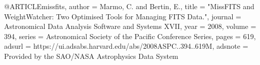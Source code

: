 
@ARTICLE{missfits,
       author = {{Marmo}, C. and {Bertin}, E.},
        title = "{MissFITS and WeightWatcher: Two Optimised Tools for Managing FITS Data.}",
      journal = {Astronomical Data Analysis Software and Systems XVII},
         year = 2008,
       volume = {394},
       series = {Astronomical Society of the Pacific Conference Series},
        pages = {619},
       adsurl = {https://ui.adsabs.harvard.edu/abs/2008ASPC..394..619M},
      adsnote = {Provided by the SAO/NASA Astrophysics Data System}
}